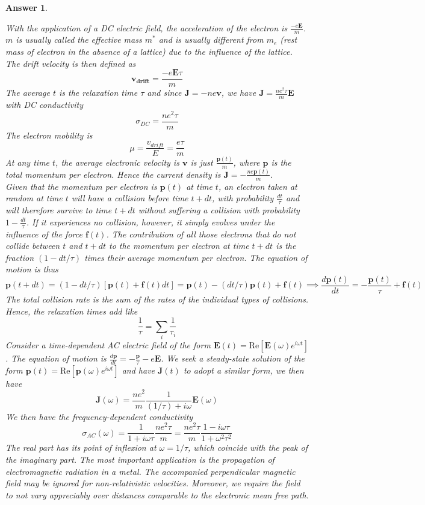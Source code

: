\documentclass[a4paper]{article}
\newtheorem{ans}{Answer}[subsection]
\theoremstyle{new}
\begin{document}
\begin{ans}
\begin{enumerate}
\end{enumerate}
With the application of a DC electric field, the acceleration of the electron is $\frac{-e\mathbf{E}}{m}$. $m$ is usually called the effective mass $m^*$ and is usually different from $m_e$ (rest mass of electron in the absence of a lattice) due to the influence of the lattice. The drift velocity is then defined as
$$\mathbf{v_{drift}}=\frac{-e\mathbf{E}\tau}{m}$$
The average $t$ is the relaxation time $\tau$ and since $\mathbf{J}=-ne\mathbf{v}$, we have $\mathbf{J}=\frac{ne^2\tau}{m}\mathbf{E}$ with DC conductivity
$$\sigma_{DC}=\frac{ne^2\tau}{m}$$
The electron mobility is
$$\mu=\frac{v_{drift}}{E}=\frac{e\tau}{m}$$
At any time $t$, the average electronic velocity is $\mathbf{v}$ is just $\frac{\mathbf{p}(t)}{m}$, where $\mathbf{p}$ is the total momentum per electron. Hence the current density is $\mathbf{J}=-\frac{ne\mathbf{p}(t)}{m}$.\\[5pt]
Given that the momentum per electron is $\mathbf{p}(t)$ at time $t$, an electron taken at random at time $t$ will have a collision before time $t+dt$, with probability $\frac{dt}{\tau}$ and will therefore survive to time $t+dt$ without suffering a collision with probability $1-\frac{dt}{\tau}$. If it experiences no collision, however, it simply evolves under the influence of the force $\textbf{f}(t)$. The contribution of all those electrons that do not collide between $t$ and $t+dt$ to the momentum per electron at time $t+dt$ is the fraction $(1-dt/\tau)$ times their average momentum per electron. The equation of motion is thus
$$\mathbf{p}(t+dt)=(1-dt/\tau)[\mathbf{p}(t)+\mathbf{f}(t)dt]=\mathbf{p}(t)-(dt/\tau)\mathbf{p}(t)+\mathbf{f}(t)\implies\frac{d\mathbf{p}(t)}{dt}=-\frac{\mathbf{p}(t)}{\tau}+\mathbf{f}(t)$$
The total collision rate is the sum of the rates of the individual types of collisions. Hence, the relaxation times add like
$$\frac{1}{\tau}=\sum_i\frac{1}{\tau_i}$$
Consider a time-dependent AC electric field of the form $\mathbf{E}(t)=\text{Re}[\mathbf{E}(\omega)e^{i\omega t}]$. The equation of motion is $\frac{d\mathbf{p}}{dt}=-\frac{\mathbf{p}}{\tau}-e\mathbf{E}$. We seek a steady-state solution of the form $\mathbf{p}(t)=\text{Re}[\mathbf{p}(\omega)e^{i\omega t}]$ and have $\mathbf{J}(t)$ to adopt a similar form, we then have
$$\mathbf{J}(\omega)=\frac{ne^2}{m}\frac{1}{(1/\tau)+i\omega}\mathbf{E}(\omega)$$
We then have the frequency-dependent conductivity
$$\sigma_{AC}(\omega)=\frac{1}{1+i\omega\tau}\frac{ne^2\tau}{m}=\frac{ne^2\tau}{m}\frac{1-i\omega\tau}{1+\omega^2\tau^2}$$
The real part has its point of inflexion at $\omega=1/\tau$, which coincide with the peak of the imaginary part. The most important application is the propagation of electromagnetic radiation in a metal. The accompanied perpendicular magnetic field may be ignored for non-relativistic velocities. Moreover, we require the field to not vary appreciably over distances comparable to the electronic mean free path.
\newpage

\end{ans}
\end{document}

